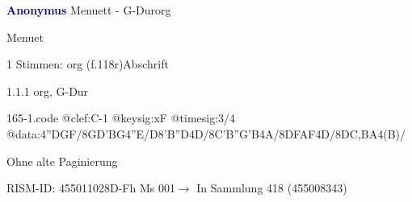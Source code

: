 \documentclass[twocolumn]{book}
\begin{document}
\par \vspace{7pt} \textcolor{darkblue}{\textbf{Anonymus  }}\hfillplus{\textbf{[165]}}\newline Menuett - G-Dur\newline org
\par \begin{itshape}[f.118r, heading:] Menuet\end{itshape} 
\par \textcolor{darkblue}{}  1 Stimmen: org  (f.118r)\newline Abschrift
\par 1.1.1  org, G-Dur  
\begin{filecontents*}{165-1.code}
@clef:C-1
@keysig:xF
@timesig:3/4
@data:4''DGF/{8GD'BG}4''E/D{8'B''D}4D/{8C'B''G'B}4A/{8DF}{AF}4D/{8DC,BA}4(B)/
\end{filecontents*}
\newline
%
\par Ohne alte Paginierung
\par RISM-ID: 455011028\newline D-Fh  Ms 001\newline $\rightarrow$ In Sammlung 418 (455008343)
      
\end{document}
